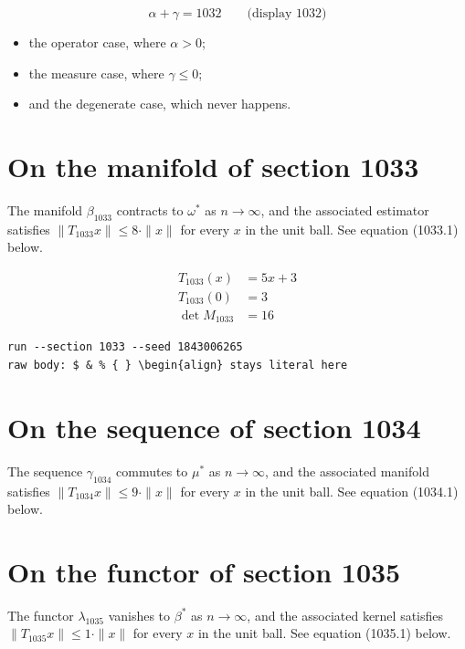 \documentclass{article}
\begin{document}
$$
\alpha + \gamma = 1032 \qquad \text{(display 1032)}
$$

\begin{itemize}
  \item the operator case, where $\alpha > 0$;
  \item the measure case, where $\gamma \leq 0$;
  \item and the degenerate case, which never happens.
\end{itemize}

\section{On the manifold of section 1033}
The manifold $\beta_{1033}$ contracts to $\omega^{*}$ as $n \to \infty$,
and the associated estimator satisfies $\|T_{1033} x\| \leq 8 \cdot \|x\|$
for every $x$ in the unit ball. See equation (1033.1) below.

\begin{align}
T_{1033}(x) &= 5 x + 3 \\
T_{1033}(0) &= 3 \\
\det M_{1033} &= 16
\end{align}

\begin{verbatim}
run --section 1033 --seed 1843006265
raw body: $ & % { } \begin{align} stays literal here
\end{verbatim}

\section{On the sequence of section 1034}
The sequence $\gamma_{1034}$ commutes to $\mu^{*}$ as $n \to \infty$,
and the associated manifold satisfies $\|T_{1034} x\| \leq 9 \cdot \|x\|$
for every $x$ in the unit ball. See equation (1034.1) below.

\section{On the functor of section 1035}
The functor $\lambda_{1035}$ vanishes to $\beta^{*}$ as $n \to \infty$,
and the associated kernel satisfies $\|T_{1035} x\| \leq 1 \cdot \|x\|$
for every $x$ in the unit ball. See equation (1035.1) below.
\end{document}
